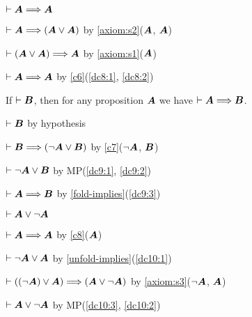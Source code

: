 \begin{dc}\label{c8}%
$\vdash\boldsymbol{A}\Longrightarrow\boldsymbol{A}$
\end{dc}

\begin{pf}
\item\label{dc8:1} $\vdash\boldsymbol{A}\Longrightarrow(\boldsymbol{A}\lor\boldsymbol{A})$
  by \ref{axiom:s2}($\boldsymbol{A}$, $\boldsymbol{A}$)
\item\label{dc8:2} $\vdash(\boldsymbol{A}\lor\boldsymbol{A})\Longrightarrow\boldsymbol{A}$
  by \ref{axiom:s1}($\boldsymbol{A}$)
\item $\vdash\boldsymbol{A}\Longrightarrow\boldsymbol{A}$ by
  \ref{c6}(\ref{dc8:1}, \ref{dc8:2})
\end{pf}

\begin{dc}\label{c9}%
If $\vdash\boldsymbol{B}$, then for any proposition $\boldsymbol{A}$
we have $\vdash\boldsymbol{A}\Longrightarrow\boldsymbol{B}$.
\end{dc}

\begin{pf}
\item\label{dc9:1} $\vdash\boldsymbol{B}$ by hypothesis
\item\label{dc9:2} $\vdash\boldsymbol{B}\Longrightarrow(\neg\boldsymbol{A}\lor\boldsymbol{B})$
  by \ref{c7}($\neg{\boldsymbol{A}}$, $\boldsymbol{B}$)
\item\label{dc9:3} $\vdash\neg\boldsymbol{A}\lor\boldsymbol{B}$ by
  MP(\ref{dc9:1}, \ref{dc9:2})
\item $\vdash\boldsymbol{A}\Longrightarrow\boldsymbol{B}$ by \ref{fold-implies}(\ref{dc9:3})
\end{pf}

\begin{dc}\label{c10}%
$\vdash\boldsymbol{A}\lor\neg\boldsymbol{A}$
\end{dc}
\begin{pf}
\item\label{dc10:1} $\vdash\boldsymbol{A}\Longrightarrow\boldsymbol{A}$
  by \ref{c8}($\boldsymbol{A}$)
\item\label{dc10:2} $\vdash\neg\boldsymbol{A}\lor\boldsymbol{A}$
  by \ref{unfold-implies}(\ref{dc10:1})
\item\label{dc10:3} $\vdash((\neg\boldsymbol{A})\lor\boldsymbol{A})\Longrightarrow(\boldsymbol{A}\lor\neg\boldsymbol{A})$
  by \ref{axiom:s3}($\neg\boldsymbol{A}$, $\boldsymbol{A}$)
\item $\vdash\boldsymbol{A}\lor\neg\boldsymbol{A}$ by
  MP(\ref{dc10:3}, \ref{dc10:2})
\end{pf}

